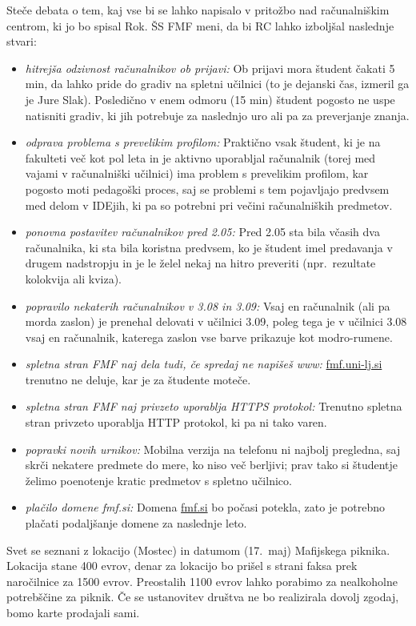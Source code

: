 \documentclass{seja}
\begin{document}
\begin{ad}
\item
Steče debata o tem, kaj vse bi se lahko napisalo v pritožbo nad računalniškim centrom, ki jo bo spisal Rok. ŠS FMF meni, da bi RC lahko izboljšal naslednje stvari:
\begin{itemize}
    \item \textit{hitrejša odzivnost računalnikov ob prijavi:} Ob prijavi mora študent čakati 5 min, da lahko pride do gradiv na spletni učilnici (to je dejanski čas, izmeril ga je Jure Slak). Posledično v enem odmoru (15 min) študent pogosto ne uspe natisniti gradiv, ki jih potrebuje za naslednjo uro ali pa za preverjanje znanja.
    \item \textit{odprava problema s prevelikim profilom:} Praktično vsak študent, ki je na fakulteti več kot pol leta in je aktivno uporabljal računalnik (torej med vajami v računalniški učilnici) ima problem s prevelikim profilom, kar pogosto moti pedagoški proces, saj se problemi s tem pojavljajo predvsem med delom v IDEjih, ki pa so potrebni pri večini računalniških predmetov.
    \item \textit{ponovna postavitev računalnikov pred 2.05:} Pred 2.05 sta bila včasih dva računalnika, ki sta bila koristna predvsem, ko je študent imel predavanja v drugem nadstropju in je le želel nekaj na hitro preveriti (npr.~rezultate kolokvija ali kviza).
    \item \textit{popravilo nekaterih računalnikov v 3.08 in 3.09:} Vsaj en računalnik (ali pa morda zaslon) je prenehal delovati v učilnici 3.09, poleg tega je v učilnici 3.08 vsaj en računalnik, katerega zaslon vse barve prikazuje kot modro-rumene.
    \item \textit{spletna stran FMF naj dela tudi, če spredaj ne napišeš www:} \url{fmf.uni-lj.si} trenutno ne deluje, kar je za študente moteče.
    \item \textit{spletna stran FMF naj privzeto uporablja HTTPS protokol:} Trenutno spletna stran privzeto uporablja HTTP protokol, ki pa ni tako varen.
    \item \textit{popravki novih urnikov:} Mobilna verzija na telefonu ni najbolj pregledna, saj skrči nekatere predmete do mere, ko niso več berljivi; prav tako si študentje želimo poenotenje kratic predmetov s spletno učilnico.
    \item \textit{plačilo domene fmf.si:} Domena \url{fmf.si} bo počasi potekla, zato je potrebno plačati podaljšanje domene za naslednje leto.
\end{itemize}

\item
Svet se seznani z lokacijo (Mostec) in datumom (17.~maj) Mafijskega piknika. Lokacija stane 400 evrov, denar za lokacijo bo prišel s strani faksa prek naročilnice za 1500 evrov. Preostalih 1100 evrov lahko porabimo za nealkoholne potrebščine za piknik. Če se ustanovitev društva ne bo realizirala dovolj zgodaj, bomo karte prodajali sami.


\end{ad}
\end{document}
